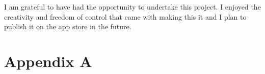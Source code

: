 \documentclass[11pt]{article}
\begin{document}
            I am grateful to have had the opportunity to undertake this project. I enjoyed the creativity and freedom of control that came with making this it and I plan to publish it on the app store in the future.
            

        
\newpage
\let\Section\section 
\def\section*#1{\Section{#1}}  

    
    
    \newpage
\Section{Appendix A}
\end{document}
